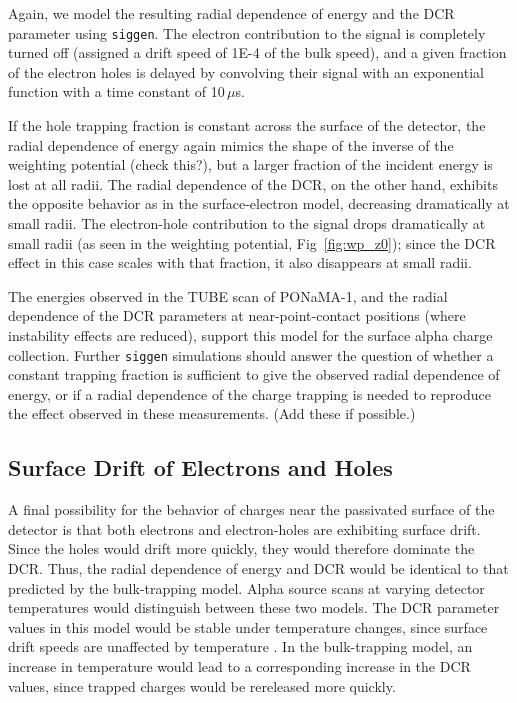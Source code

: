 \documentclass[groupedaddress,rmp,amsmath,amssymb,bibnotes,altaffilletter,twocolumn]{revtex4-1}
\begin{document}
Again, we model the resulting radial dependence of energy and the DCR parameter using {\tt siggen}. The electron contribution to the signal is completely turned off (assigned a drift speed of 1E-4 of the bulk speed), and a given fraction of the electron holes is delayed by convolving their signal with an exponential function with a time constant of 10\,$\mu$s. 

If the hole trapping fraction is constant across the surface of the detector, the radial dependence of energy again mimics the shape of the inverse of the weighting potential (check this?), but a larger fraction of the incident energy is lost at all radii. The radial dependence of the DCR, on the other hand, exhibits the opposite behavior as in the surface-electron model, decreasing dramatically at small radii. The electron-hole contribution to the signal drops dramatically at small radii (as seen in the weighting potential, Fig~\ref{fig:wp_z0}); since the DCR effect in this case scales with that fraction, it also disappears at small radii. 

The energies observed in the TUBE scan of PONaMA-1, and the radial dependence of the DCR parameters at near-point-contact positions (where instability effects are reduced), support this model for the surface alpha charge collection. Further {\tt siggen} simulations should answer the question of whether a constant trapping fraction is sufficient to give the observed radial dependence of energy, or if a radial dependence of the charge trapping is needed to reproduce the effect observed in these measurements. (Add these if possible.)

\subsection{Surface Drift of Electrons and Holes}
A final possibility for the behavior of charges near the passivated surface of the detector is that both electrons and electron-holes are exhibiting surface drift. Since the holes would drift more quickly, they would therefore dominate the DCR. Thus, the radial dependence of energy and DCR would be identical to that predicted by the bulk-trapping model. Alpha source scans at varying detector temperatures would distinguish between these two models. The DCR parameter values in this model would be stable under temperature changes, since surface drift speeds are unaffected by temperature \cite{Mullowney2012?}. In the bulk-trapping model, an increase in temperature would lead to a corresponding increase in the DCR values, since trapped charges would be rereleased more quickly. 
\end{document}
